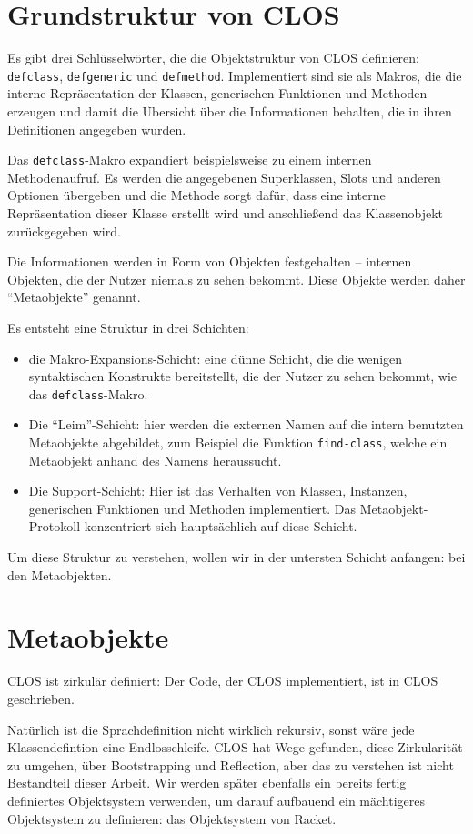 

\section{Grundstruktur von CLOS}
Es gibt drei Schlüsselwörter, die die Objektstruktur von CLOS definieren:  \texttt{defclass}, \texttt{defgeneric} und \texttt{defmethod}. Implementiert sind sie als Makros, die die interne Repräsentation der Klassen, generischen Funktionen und Methoden erzeugen und damit die Übersicht über die Informationen behalten, die in ihren Definitionen angegeben wurden.

Das \texttt{defclass}-Makro expandiert beispielsweise zu einem internen Methodenaufruf. Es werden die angegebenen Superklassen, Slots und anderen Optionen übergeben und die Methode sorgt dafür, dass eine interne Repräsentation dieser Klasse erstellt wird und anschließend das Klassenobjekt zurückgegeben wird.

Die Informationen werden in Form von Objekten festgehalten -- internen Objekten, die der Nutzer niemals zu sehen bekommt. Diese Objekte werden daher ``Metaobjekte'' genannt.

Es entsteht eine Struktur in drei Schichten:
\begin{itemize}
 \item die Makro-Expansions-Schicht: eine dünne Schicht, die die wenigen syntaktischen Konstrukte bereitstellt, die der Nutzer zu sehen bekommt, wie das \texttt{defclass}-Makro.
 \item Die ``Leim''-Schicht: hier werden die externen Namen auf die intern benutzten Metaobjekte abgebildet, zum Beispiel die Funktion \texttt{find-class}, welche ein Metaobjekt anhand des Namens heraussucht.
 \item Die Support-Schicht: Hier ist das Verhalten von Klassen, Instanzen, generischen Funktionen und Methoden implementiert. Das Metaobjekt-Protokoll konzentriert sich hauptsächlich auf diese Schicht.
\end{itemize}

Um diese Struktur zu verstehen, wollen wir in der untersten Schicht anfangen: bei den Metaobjekten.

\section{Metaobjekte}
CLOS ist zirkulär definiert: Der Code, der CLOS implementiert, ist in CLOS geschrieben. 

Natürlich ist die Sprachdefinition nicht wirklich rekursiv, sonst wäre jede Klassendefintion eine Endlosschleife. CLOS hat Wege gefunden, diese Zirkularität zu umgehen, über Bootstrapping und Reflection, aber das zu verstehen ist nicht Bestandteil dieser Arbeit. Wir werden später ebenfalls ein bereits fertig definiertes Objektsystem verwenden, um darauf aufbauend ein mächtigeres Objektsystem zu definieren: das Objektsystem von Racket.

